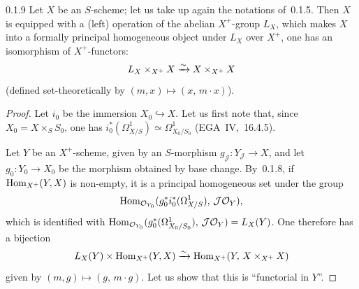 \begin{corollary}{0.1.9}
\label{III.0.1.9}
{\renewcommand{\thefootnote}{(15)}}%
Let \(X\) be an \(S\)-scheme; let us take up again the notations of~0.1.5.
Then \(X\) is equipped with a (left) operation of the abelian
\(X^{+}\)-group \(L_{X}\), which makes \(X\) into a formally
principal homogeneous object under \(L_{X}\) over \(X^{+}\), \ie
one has an isomorphism of \(X^{+}\)-functors:
\[
L_{X}\times_{X^{+}}X
\xrightarrow{\sim}
X\times_{X^{+}}X
\]
(defined set-theoretically by \((m,x)\mapsto(x,\,m\cdot x)\)).
\end{corollary}

\begin{proof}
Let \(i_{0}\) be the immersion \(X_{0}\hookrightarrow X\). Let us first note
that, since \(X_{0}=X\times_{S}S_{0}\), one has
\(i_{0}^{*}(\Omega^{1}_{X/S})\simeq\Omega^{1}_{X_{0}/S_{0}}\)
(\cf EGA~IV,~16.4.5).

Let \(Y\) be an \(X^{+}\)-scheme, given by an \(S\)-morphism
\(g_{\mathcal{J}}\colon Y_{\mathcal{J}}\to X\), and let
\(g_{0}\colon Y_{0}\to X_{0}\) be the morphism obtained by base change.
By~0.1.8, if \(\operatorname{Hom}_{X^{+}}(Y,X)\) is non-empty, it is a principal
homogeneous set under the group
\[
\operatorname{Hom}_{\mathcal{O}_{Y_{0}}}(g_{0}^{*}i_{0}^{*}(\Omega^{1}_{X/S}),\,\mathcal{J}\mathcal{O}_{Y}),
\]
which is identified with
\(\operatorname{Hom}_{\mathcal{O}_{Y_{0}}}(g_{0}^{*}(\Omega^{1}_{X_{0}/S_{0}}),\,\mathcal{J}\mathcal{O}_{Y})
=L_{X}(Y)\). One therefore has a bijection
\[
L_{X}(Y)\times\operatorname{Hom}_{X^{+}}(Y,X)
\xrightarrow{\sim}
\operatorname{Hom}_{X^{+}}(Y,\,X\times_{X^{+}}X)
\]
given by \((m,g)\mapsto(g,\,m\cdot g)\). Let us show that this is ``functorial
in \(Y\)''.


\end{proof}
